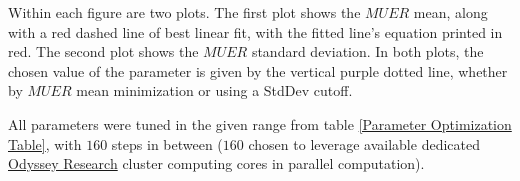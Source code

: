 Within each figure are two plots.  The first plot shows the $MUER$ mean, along with a red dashed line of best linear fit, with the fitted line's equation printed in red.  The second plot shows the $MUER$ standard deviation.  In both plots, the chosen value of the parameter is given by the vertical purple dotted line, whether by $MUER$ mean minimization or using a StdDev cutoff.  

All parameters were tuned in the given range from table \ref{Parameter Optimization Table}, with $160$ steps in between ($160$ chosen to leverage available dedicated \href{https://www.rc.fas.harvard.edu/}{Odyssey Research} cluster computing cores in parallel computation).  


\label{MUER Minimization Parameter Optimization}


